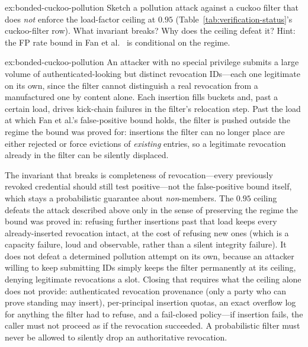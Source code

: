 \documentclass[11pt,a4paper]{article}
\theoremstyle{definition}
\theoremstyle{remark}
\begin{document}
\begin{pdexercise}[kind=Trace,rating=2]{ex:bonded-cuckoo-pollution}
Sketch a pollution attack against a cuckoo filter that does \emph{not} enforce the load-factor ceiling at $0.95$ (Table~\ref{tab:verification-status}'s cuckoo-filter row). What invariant breaks? Why does the ceiling defeat it? Hint: the FP rate bound in Fan et al.~ is conditional on the regime.
\end{pdexercise}
\begin{pdsolution}{ex:bonded-cuckoo-pollution}
An attacker with no special privilege submits a large volume of authenticated-looking but distinct revocation IDs---each one legitimate on its own, since the filter cannot distinguish a real revocation from a manufactured one by content alone. Each insertion fills buckets and, past a certain load, drives kick-chain failures in the filter's relocation step. Past the load at which Fan et al.'s false-positive bound holds, the filter is pushed outside the regime the bound was proved for: insertions the filter can no longer place are either rejected or force evictions of \emph{existing} entries, so a legitimate revocation already in the filter can be silently displaced.

The invariant that breaks is completeness of revocation---every previously revoked credential should still test positive---not the false-positive bound itself, which stays a probabilistic guarantee about \emph{non}-members. The $0.95$ ceiling defeats the attack described above only in the sense of preserving the regime the bound was proved in: refusing further insertions past that load keeps every already-inserted revocation intact, at the cost of refusing new ones (which is a capacity failure, loud and observable, rather than a silent integrity failure). It does not defeat a determined pollution attempt on its own, because an attacker willing to keep submitting IDs simply keeps the filter permanently at its ceiling, denying legitimate revocations a slot. Closing that requires what the ceiling alone does not provide: authenticated revocation provenance (only a party who can prove standing may insert), per-principal insertion quotas, an exact overflow log for anything the filter had to refuse, and a fail-closed policy---if insertion fails, the caller must not proceed as if the revocation succeeded. A probabilistic filter must never be allowed to silently drop an authoritative revocation.
\end{pdsolution}

\end{document}
